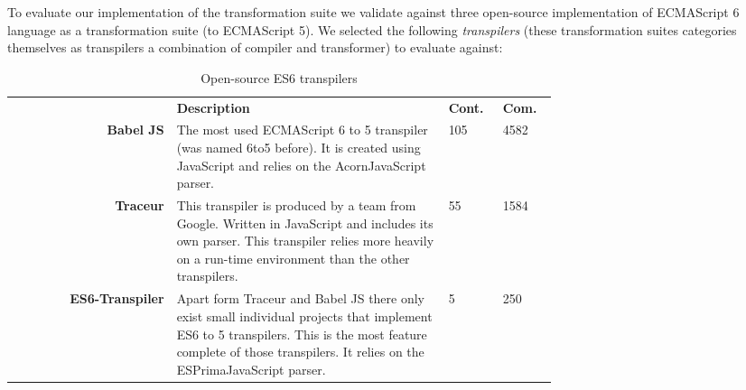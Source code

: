 To evaluate our implementation of the transformation suite we validate against three open-source implementation of ECMAScript 6 language as a transformation suite (to ECMAScript 5). We selected the following \textit{transpilers} (these transformation suites categories themselves as transpilers a combination of compiler and transformer) to evaluate against:

\begin{table}[h]
\def\arraystretch{1.5}
\caption{Open-source ES6 transpilers}
\label{transpilers}
\begin{tabular}{rp{0.5\linewidth}p{0.1\linewidth}p{0.1\linewidth}}
 & \textbf{Description} & \textbf{Cont.} & \textbf{Com.} \\
{\bf Babel JS\footnotemark[1]} & The most used ECMAScript 6 to 5 transpiler (was named 6to5 before). It is created using JavaScript and relies on the Acorn\footnotemark[4] JavaScript parser. & 105 & 4582 \\
{\bf Traceur\footnotemark[2]} & This transpiler is produced by a team from Google. Written in JavaScript and includes its own parser. This transpiler relies more heavily on a run-time environment than the other transpilers. & 55 & 1584\\
{\bf ES6-Transpiler\footnotemark[3]} & Apart form Traceur and Babel JS there only exist small individual projects that implement ES6 to 5 transpilers. This is the most feature complete of those transpilers. It relies on the ESPrima\footnotemark[5] JavaScript parser. & 5 & 250 \\
\end{tabular}
\end{table}


